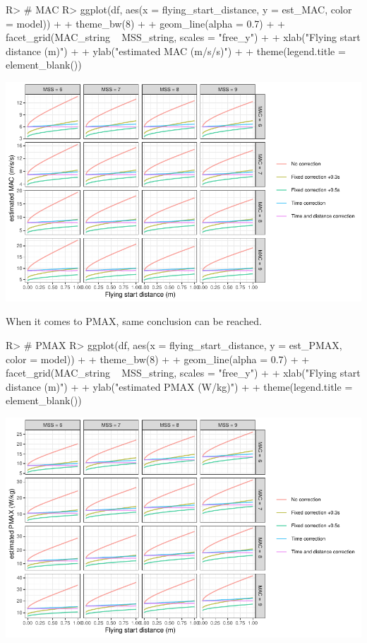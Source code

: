 \documentclass[
]{jss}
\begin{document}
\begin{CodeChunk}
\begin{CodeInput}
R> # MAC
R> ggplot(df, aes(x = flying_start_distance, y = est_MAC, color = model)) +
+   theme_bw(8) +
+   geom_line(alpha = 0.7) +
+   facet_grid(MAC_string ~ MSS_string, scales = "free_y") +
+   xlab("Flying start distance (m)") +
+   ylab("estimated MAC (m/s/s)") +
+   theme(legend.title = element_blank())
\end{CodeInput}


\begin{center}\includegraphics[width=1\linewidth]{paper_files/figure-latex/unnamed-chunk-36-1} \end{center}

\end{CodeChunk}

When it comes to PMAX, same conclusion can be reached.

\begin{CodeChunk}
\begin{CodeInput}
R> # PMAX
R> ggplot(df, aes(x = flying_start_distance, y = est_PMAX, color = model)) +
+   theme_bw(8) +
+   geom_line(alpha = 0.7) +
+   facet_grid(MAC_string ~ MSS_string, scales = "free_y") +
+   xlab("Flying start distance (m)") +
+   ylab("estimated PMAX (W/kg)") +
+   theme(legend.title = element_blank())
\end{CodeInput}


\begin{center}\includegraphics[width=1\linewidth]{paper_files/figure-latex/unnamed-chunk-37-1} \end{center}

\end{CodeChunk}
\end{document}
